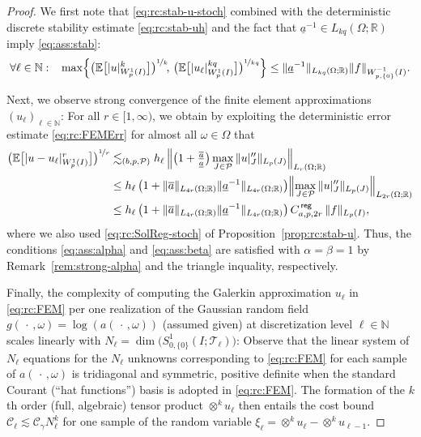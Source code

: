 \documentclass[reqno]{amsart}
\numberwithin{equation}{section}
\newcommand{\bbE}{\mathbb{E}}
\newcommand{\bbN}{\mathbb{N}}
\newcommand{\bbR}{\mathbb{R}}
\newcommand{\cC}{\mathcal{C}}
\newcommand{\cP}{\mathcal{P}}
\newcommand{\cT}{\mathcal{T}}
\newcommand{\xk}{\otimes^k}
\newcommand{\norm}[2]{     \| #1       \|_{ #2 }}
\newcommand{\seminorm}[2]{  | #1        |_{ #2 }}
\theoremstyle{remark}
\theoremstyle{definition}
\begin{document}
\begin{proof} 
	We first note that \eqref{eq:rc:stab-u-stoch} 
	combined with the deterministic 
	discrete stability estimate \eqref{eq:rc:stab-uh} 
	and the fact that 
	$\underline{a}^{-1}\in L_{kq}(\Omega;\bbR)$ imply 
	\eqref{eq:ass:stab}: 
	\[
	\forall\ell\in\bbN: 
	\;\;\;  
	\max\Bigl\{ 
	\bigl( \bbE\bigl[ \seminorm{u}{W^1_p(I)}^k \bigr] 
	\bigr)^{\nicefrac{1}{k}}\! , \,
	\bigl( \bbE\bigl[ \seminorm{u_\ell}{W^1_p(I)}^{kq} \bigr] 
	\bigr)^{\nicefrac{1}{kq}} 
	\Bigr\}
	\leq 
	\norm{ \underline{a}^{-1} }{L_{kq}(\Omega;\bbR)} 
	\norm{ f }{W^{-1}_{p,\{0\}}(I)}. 
	\]
	
	Next, we observe strong convergence of the finite 
	element approximations $( u_\ell)_{\ell\in\bbN}$: 
	For all $r\in[1,\infty)$, we obtain 
	by exploiting the deterministic error estimate 
	\eqref{eq:rc:FEMErr} for almost all $\omega\in\Omega$ that 
	\begin{align*} 
	\bigl( \bbE\bigl[ | u - u_\ell |_{W^1_p(I)}^r \bigr]
	\bigr)^{\nicefrac{1}{r}}  
	&\lesssim_{(b,p,\cP)} 
	h_\ell \,   
	\Bigl\| 
	\bigl( 1 + \tfrac{\overline{a}}{\underline{a}} \bigr) 
	\max_{J\in\cP} \norm{ u|_J'' }{L_p(J)} 
	\Bigr\|_{L_r(\Omega;\bbR)} 
	\\
	&\leq 
	h_\ell \, 
	\bigl( 1 + \norm{ \overline{a} }{L_{4r}(\Omega;\bbR)} 
	\norm{ \underline{a}^{-1} }{L_{4r}(\Omega;\bbR)} \bigr) 
	\Bigl\| \max_{J\in\cP} \norm{ u|_J'' }{L_p(J)} \Bigr\|_{L_{2r}(\Omega;\bbR)} 
	\\ 
	&\leq
	h_\ell \, 
	\bigl( 1 + \norm{ \overline{a} }{L_{4r}(\Omega;\bbR)} 
	\norm{ \underline{a}^{-1} }{L_{4r}(\Omega;\bbR)} \bigr) 
	\, C_{a,p,2r}^{\sf\, reg} \, \norm{f}{L_p(I)}, 
	\end{align*} 
	where we also used \eqref{eq:rc:SolReg-stoch} 
	of Proposition~\ref{prop:rc:stab-u}. 
	Thus, the conditions 
	\eqref{eq:ass:alpha} and \eqref{eq:ass:beta} 
	are satisfied with 
	$\alpha=\beta=1$ 
	by Remark~\ref{rem:strong-alpha} 
	and the triangle inquality, respectively.  
	
	Finally, the 
	complexity of computing the Galerkin approximation  
	$u_\ell$ in \eqref{eq:rc:FEM} per one realization  
	of the Gaussian random field 
	$g(\,\cdot\,, \omega)=\log(a(\,\cdot\,, \omega))$
	(assumed given) 
	at discretization level $\ell\in\bbN$ 
	scales linearly with 
	$N_\ell = \dim\bigl(S^1_{0,\{0\}}(I;\cT_\ell) \bigr)$: 
	Observe that the linear system 
	of $N_\ell$ equations for the $N_\ell$ unknowns 
	corresponding to \eqref{eq:rc:FEM} 
	for each sample of $a(\,\cdot\,,\omega)$ 
	is tridiagonal and symmetric, positive definite
	when the standard Courant (``hat functions'')  
	basis is adopted in \eqref{eq:rc:FEM}. 
	The formation of the $k$th order 
	(full, algebraic) tensor product $\otimes^k u_\ell$ 
	then entails the cost bound 
	$\cC_\ell \lesssim \cC_\gamma N_\ell^k$
	for one sample of the random 
	variable $\xi_\ell = \xk u_\ell - \xk u_{\ell-1}$. 
\end{proof} 
\end{document}
